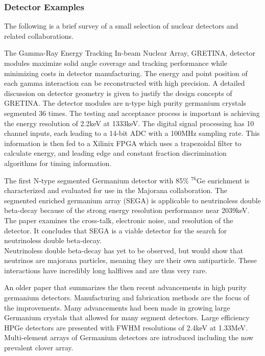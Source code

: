 \documentclass[12pt]{article}
\begin{document}
\begin{doublespacing}
\subsubsection{Detector Examples}

The following is a brief survey of a small selection of nuclear detectors and related collaborations.

\citep{Paschalis201344}
The Gamma-Ray Energy Tracking In-beam Nuclear Array, GRETINA, detector modules maximize solid angle coverage and tracking performance while minimizing costs in detector manufacturing.
The energy and point position of each gamma interaction can be reconstructed with high precision.
A detailed discussion on detector geometry is given to justify the design concepts of GRETINA.
The detector modules are n-type high purity germanium crystals segmented 36 times.
The testing and acceptance process is important is achieving the energy resolution of 2.2keV at 1333keV.
The digital signal processing has 10 channel inputs, each leading to a 14-bit ADC with a 100MHz sampling rate.
This information is then fed to a Xilinix FPGA which uses a trapezoidal filter to calculate energy, and leading edge and constant fraction discrimination algorithms for timing information.

\citep{Leviner201466}
The first N-type segmented Germanium detector with 85\% $^{76}\mbox{Ge}$ enrichment is characterized and evaluated for use in the Majorana collaboration.
The segmented enriched germanium array (SEGA) is applicable to neutrinoless double beta-decay because of the strong energy resolution performance near 2039keV.
The paper examines the cross-talk, electronic noise, and resolution of the detector.
It concludes that SEGA is a viable detector for the search for neutrinoless double beta-decay.
\\
Neutrinoless double beta-decay has yet to be observed, but would show that neutrinos are majorana particles, meaning they are their own antiparticle.
These interactions have incredibly long halflives and are thus very rare.


\citep{Sangsingkeow2003183}
An older paper that summarizes the then recent advancements in high purity germanium detectors.
Manufacturing and fabrication methods are the focus of the improvements.
Many advancements had been made in growing large Germanium crystals that allowed for many segment detectors.
Large efficiency HPGe detectors are presented with FWHM resolutions of 2.4keV at 1.33MeV.
Multi-element arrays of Germanium detectors are introduced including the now prevalent clover array.
\\


\end{doublespacing}
\end{document}
